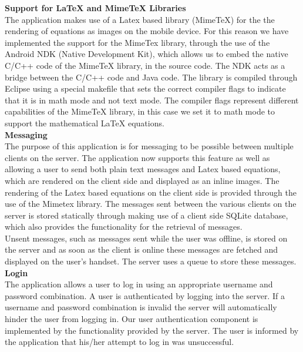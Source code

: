 \documentclass[29pt,a4paper]{moderncv}
\begin{document}
			\noindent\textbf{Support for LaTeX and MimeTeX Libraries}
			\\The application makes use of a Latex based library (MimeTeX) for the the rendering of equations as images on the mobile device.  For this reason we have implemented the support for the MimeTex library, through the use of the Android NDK (Native Development Kit), which allows us to embed the native C/C++ code of the MimeTeX library, in the source code. 
			\parindent 5mm The NDK acts as a bridge between the C/C++ code and Java code. The library is compiled through Eclipse using a special makefile that sets the correct compiler flags to indicate that it is in math mode and not text mode. The compiler flags represent different capabilities of the MimeTeX library, in this case we set it to math mode to support the mathematical LaTeX equations.\\
			
			
			\noindent\textbf{Messaging}
			\\The purpose of this application is for messaging to be possible between multiple clients on the server. The application now supports this feature as well as allowing a user to send both plain text messages and Latex based equations, which are rendered on the client side and displayed as an inline images.
			\parindent 5mm The rendering of the Latex based equations on the client side is provided through the use of the Mimetex library. The messages sent between the various clients on the server is stored statically through making use of a client side SQLite database, which also provides the functionality for the retrieval of messages.
			\\Unsent messages, such as messages sent while the user was offline, is stored on the server and as soon as the client is online these messages are fetched and displayed on the user's handset. The server uses a queue to store these messages.\\
			
			\noindent\textbf{Login}
			\\The application allows a user to log in using an appropriate username and password combination. A user is authenticated by logging into the server.  If a username and password combination is invalid the server will automatically hinder the user from logging in. Our user authentication component is implemented by the functionality provided by the server. The user is informed by the application that his/her attempt to log in was unsuccessful.\\
			
\end{document}
